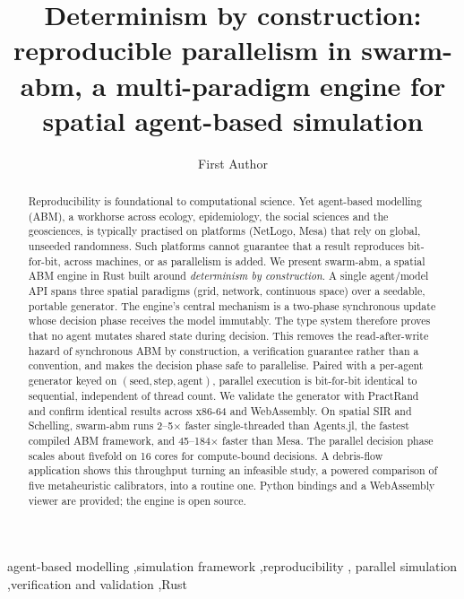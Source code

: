 \documentclass[review]{elsarticle}
\begin{document}
\begin{frontmatter}

\title{Determinism by construction: reproducible parallelism in swarm-abm,
a multi-paradigm engine for spatial agent-based simulation}

\author[a]{First Author}

\begin{abstract}
Reproducibility is foundational to computational science. Yet agent-based
modelling (ABM), a workhorse across ecology, epidemiology, the social sciences
and the geosciences, is typically practised on platforms (NetLogo, Mesa) that
rely on global, unseeded randomness. Such platforms cannot guarantee that a
result reproduces bit-for-bit, across machines, or as parallelism is added. We
present swarm-abm, a spatial ABM engine in Rust built around \emph{determinism
by construction}. A single agent/model API spans three spatial paradigms (grid,
network, continuous space) over a seedable, portable generator. The engine's
central mechanism is a two-phase synchronous update whose decision phase
receives the model immutably. The type system therefore proves that no agent
mutates shared state during decision. This removes the read-after-write hazard
of synchronous ABM by construction, a verification guarantee rather than a
convention, and makes the decision phase safe to parallelise. Paired with a
per-agent generator keyed on $(\text{seed},\text{step},\text{agent})$, parallel
execution is bit-for-bit identical to sequential, independent of thread count.
We validate the generator with PractRand and confirm identical results across
x86-64 and WebAssembly. On spatial SIR and Schelling, swarm-abm runs
2--5$\times$ faster single-threaded than Agents.jl, the fastest compiled ABM
framework, and 45--184$\times$ faster than Mesa. The parallel decision phase
scales about fivefold on 16 cores for compute-bound decisions. A debris-flow
application shows this throughput turning an infeasible study, a powered
comparison of five metaheuristic calibrators, into a routine one. Python
bindings and a WebAssembly viewer are provided; the engine is open source.
\end{abstract}

\begin{keyword}
agent-based modelling \sep simulation framework \sep reproducibility \sep
parallel simulation \sep verification and validation \sep Rust
\end{keyword}

\end{frontmatter}
\end{document}
